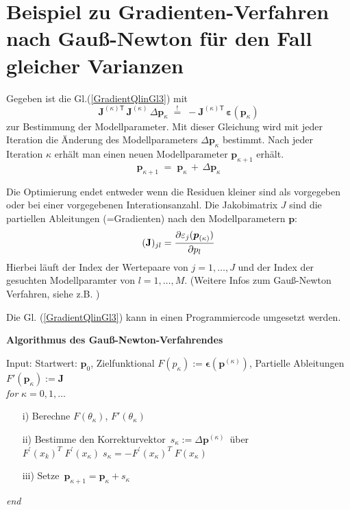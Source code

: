 \section{Beispiel zu Gradienten-Verfahren nach Gauß-Newton für den Fall gleicher Varianzen}

Gegeben ist die Gl.(\ref{GradientQlinGl3}) mit
\[
 \boldsymbol{J}^{(\kappa) \textsf{T}} \, \boldsymbol{J}^{(\kappa)} \, \Delta \mathbf{p}_\kappa
\; \overset{!}{=} \;
-  \boldsymbol{J}^{(\kappa) \textsf{T}} \, \boldsymbol{\varepsilon}(\mathbf{p}_\kappa)
\]
zur Bestimmung der Modellparameter. Mit dieser Gleichung wird mit jeder Iteration die Änderung des Modellparameters
$\Delta \mathbf{p}_\kappa$ bestimmt. Nach jeder Iteration $\kappa$  erhält man einen neuen Modellparameter  $\mathbf{p}_{\kappa +1}$ erhält.
\[
\mathbf{p}_{\kappa+1} \; = \; \mathbf{p}_{\kappa} \, + \,
\Delta \mathbf{p}_{\kappa}
\]

Die Optimierung endet entweder wenn die Residuen kleiner sind als vorgegeben oder
bei einer vorgegebenen Interationsanzahl.
Die Jakobimatrix $J$ sind die partiellen Ableitungen (=Gradienten) nach den
Modellparametern $\boldsymbol{p}$:
\[ (\mathbf{J})_{jl} = \frac{\displaystyle \partial \varepsilon_j (\boldsymbol p_{(\kappa)})}{\displaystyle \partial  p_l}\]
Hierbei läuft der Index der Wertepaare von $j=1,\ldots,J$  und der Index
der gesuchten Modellparamter von $l=1,\ldots,M$.
(Weitere Infos zum Gauß-Newton Verfahren, siehe z.B. \cite{Wiki02})

Die Gl. (\ref{GradientQlinGl3}) kann in einen Programmiercode
umgesetzt werden.

\textbf{Algorithmus des Gauß-Newton-Verfahrendes}

Input: Startwert: $\boldsymbol p_0$, Zielfunktional $F(p_\kappa):= \boldsymbol\epsilon (\boldsymbol p^{(\kappa)}) $, Partielle Ableitungen $F'(\boldsymbol p_{\kappa}) := \mathbf J$ \\
\hspace*{1em}\textit{for} $\kappa = 0,1, \ldots$ \\[-3ex]
\begin{itemize}
	\item[i)] Berechne $F(\theta_\kappa)$, $F'(\theta_\kappa)$
	\item[ii)] Bestimme den Korrekturvektor~$s_\kappa := \Delta \boldsymbol p^{(\kappa)}$~über~
	$F^\prime(x_k)^T\;F^\prime(x_\kappa)\; s_\kappa = -F^\prime(x_\kappa)^T\;F(x_\kappa)$
	\item[iii)] Setze~$\boldsymbol p_{\kappa+1} = \boldsymbol p_\kappa + s_\kappa$
\end{itemize}
\hspace*{1em}\textit{end} \\

